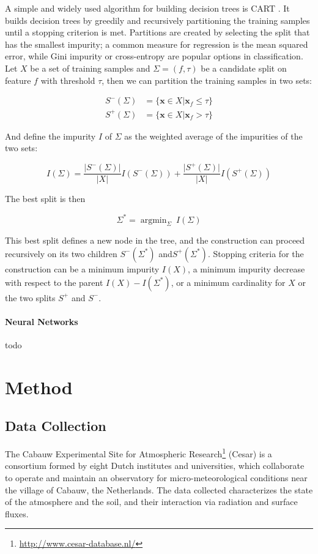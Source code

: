 \documentclass[12pt]{book}
\DeclareMathOperator*{\argmin}{argmin}
\begin{document}
A simple and widely used algorithm for building decision trees is CART \cite{cart}. It builds decision trees by greedily and recursively partitioning the training samples until a stopping criterion is met. Partitions are created by selecting the split that has the smallest impurity; a common measure for regression is the mean squared error, while Gini impurity or cross-entropy are popular options in classification. Let $X$ be a set of training samples and $\Sigma=(f,\tau)$ be a candidate split on feature $f$ with threshold $\tau$, then we can partition the training samples in two sets:

\begin{align}
S^-(\Sigma)&=\{\bm x\in X\vert \bm x_f\leq\tau\} \\
S^+(\Sigma)&=\{\bm x\in X\vert \bm x_f>\tau\}
\end{align}

And define the impurity $I$ of $\Sigma$ as the weighted average of the impurities of the two sets:

\begin{equation}
I(\Sigma)=\frac{\vert S^-(\Sigma)\vert}{\vert X\vert}I(S^-(\Sigma))+\frac{\vert S^+(\Sigma)\vert}{\vert X\vert}I(S^+(\Sigma))
\end{equation}

The best split is then

\begin{equation}
\Sigma^*=\argmin_{\Sigma}\ I(\Sigma)
\end{equation}

This best split defines a new node in the tree, and the construction can proceed recursively on its two children $S^-(\Sigma^*)$ and$ S^+(\Sigma^*)$. Stopping criteria for the construction can be a minimum impurity $I(X)$, a minimum impurity decrease with respect to the parent $I(X) - I(\Sigma^*)$, or a minimum cardinality for $X$ or the two splits $S^+$ and $S^-$.

\subsubsection{Neural Networks}
todo

\chapter{Method}

\section{Data Collection}
The Cabauw Experimental Site for Atmospheric Research\footnote{\url{http://www.cesar-database.nl/}} (Cesar) is a consortium formed by eight Dutch institutes and universities, which collaborate to operate and maintain an observatory for micro-meteorological conditions near the village of Cabauw, the Netherlands. The data collected characterizes the state of the atmosphere and the soil, and their interaction via radiation and surface fluxes.
\end{document}
